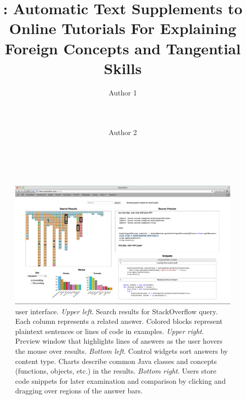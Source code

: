 \documentclass{sigchi}
\begin{document}
\title{\systemname{}: Automatic Text Supplements to Online Tutorials For Explaining Foreign Concepts and Tangential Skills}

\author{
  \alignauthor Author 1\\
    \\
    \\
    \\
  \alignauthor Author 2\\
    \\
    \\
}

\makeatletter
\let\@oldmaketitle\@maketitle
\renewcommand{\@maketitle}{\@oldmaketitle}
\makeatother

\maketitle





\begin{figure}
 \centering
 \includegraphics[width=.9\linewidth]{figures/ui_full}
 \caption{\systemname{} user interface. 
 \emph{Upper left}.
 Search results for StackOverflow query.
 Each column represents a related answer.
 Colored blocks represent plaintext sentences or lines of code in examples.
 \emph{Upper right}.
 Preview window that highlights lines of answers as the user hovers the mouse over results.
 \emph{Bottom left}.
 Control widgets sort answers by content type.
 Charts describe common Java classes and concepts (functions, objects, etc.) in the results.
 \emph{Bottom right}.
 Users store code snippets for later examination and comparison by clicking and dragging over regions of the answer bars.
 }
 \label{fig:user_interface}
\end{figure}
\fi
\end{document}
